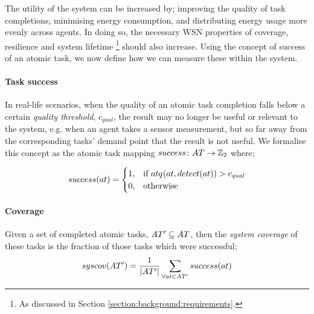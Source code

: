 The utility of the system can be increased by; improving the quality of task completions, minimising energy consumption, and distributing energy usage more evenly across agents. In doing so, the necessary WSN properties of coverage, resilience and system lifetime \footnote{As discussed in Section \ref{section:background:requirements}.} should also increase. Using the concept of success of an atomic task, we now define how we can measure these within the system.

\newcommand{\varQualityMin}[2]{c_{\textit{qual}}}

\newcommand{\formalAtomicTaskSuccess}[2]{
	\functionFormal{success}
	{\setAtomicTask{}{}}
	{\setIntegersBinary{}{}}
}
\newcommand{\functionAtomicTaskSuccess}[2]{
	\functionSignature{success}{\varAtomicTask{#1}{#2}}
}

\newcommand{\formalCompositeTaskCoverage}[2]{
	\functionFormal{taskcov}
	{\setCompositeTask{}{}}
	{\setRealNumbersUnit{}{}}
}
\newcommand{\functionCompositeTaskCoverage}[2]{
	\functionSignature{taskcov}{\varCompositeTask{}{}}
}


\newcommand{\functionSystemCoverage}[2]{
	\functionSignature{syscov}{\setAtomicTaskInstance{}{}}
}

\paragraph{Task success}
\label{section:success}
In real-life scenarios, when the quality of an atomic task completion falls below a certain \textit{quality threshold}, $\varQualityMin{}{}$, the result may no longer be useful or relevant to the system, e.g. when an agent takes a sensor measurement, but so far away from the corresponding tasks' demand point that the result is not useful.  We formalise this concept as the atomic task mapping $\formalAtomicTaskSuccess{}{}$ where;

\begin{equation}
	 \functionAtomicTaskSuccess{}{}
	 = 
	\begin{cases}
		1, & \text{if } \functionAtomicTaskQualitySensor{}{} > \varQualityMin{}{} \\
		0, & \text{otherwise}
	\end{cases}
\end{equation}

\paragraph{Coverage}
\label{section:coverage}
Given a set of completed atomic tasks, $\setAtomicTaskInstance{}{} \subseteq \setAtomicTask{}{}$, then the \textit{system coverage} of these tasks is the fraction of those tasks which were successful;
\begin{equation}
	\label{eq:coverage}
	\functionSystemCoverage{}{}
	=
	\frac{1}{\funcSize{\setAtomicTaskInstance{}{}}}
	\sum\limits_{\forall \varAtomicTask{}{} \in \setAtomicTaskInstance{}{}}
	\functionAtomicTaskSuccess{}{}
\end{equation}

